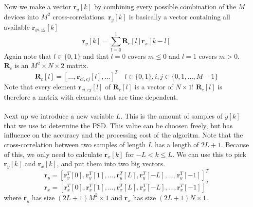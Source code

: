 \documentclass[report, oneside, a4paper, openany]{memoir}
\begin{document}
Now we make a vector $\mathbf{r}_y[k]$ by combining every possible combination of the $M$ devices into $M^2$ cross-correlations. $\mathbf{r}_y[k]$ is basically a vector containing all available $\mathbf{r}_{yi,yj}[k]$
$$
\mathbf{r}_y[k]=\sum_{l=0}^1\mathbf{R}_c[l]\mathbf{r}_x[k-l]
$$
Again note that $l \in \{0,1\}$ and that $l=0$ covers $m\leq 0$ and $l=1$ covers $m > 0$. $\mathbf{R}_c$ is an $M^2 \times N \times 2$ matrix.
$$
\mathbf{R}_c[l] = [\dots,\mathbf{r}_{ci,cj}[l],\dots]^T \quad l \in \{0,1\}, i,j \in \{0,1, \dots, M-1\}
$$
Note that every element $\mathbf{r}_{ci,cj}[l]$ of $\mathbf{R}_c[l]$ is a vector of $N \times 1$! $\mathbf{R}_c[l]$ is therefore a matrix with elements that are time dependent.\\
\\
Next up we introduce a new variable $L$. This is the amount of samples of $y[k]$ that we use to determine the PSD. This value can be choosen freely, 
but has influence on the accuracy and the processing cost of the algoritm. 
Note that the cross-correlation between two samples of length $L$ has a length of $2L+1$. 
Because of this, we only need to calculate $\mathbf{r}_x[k]$ for $-L<k\leq L$. 
We can use this to pick $\mathbf{r}_y[k]$ and $\mathbf{r}_x[k]$, and put them into two big vectors.
$$
\mathbf{r}_y = [\mathbf{r}^T_y[0],\mathbf{r}^T_y[1],\dots,\mathbf{r}^T_y[L],\mathbf{r}^T_y[-L],\dots,\mathbf{r}^T_y[-1]]^T
$$
$$
\mathbf{r}_x = [\mathbf{r}^T_x[0],\mathbf{r}^T_x[1],\dots,\mathbf{r}^T_x[L],\mathbf{r}^T_x[-L],\dots,\mathbf{r}^T_x[-1]]^T
$$
where $\mathbf{r}_y$ has size $(2L+1)M^2\times 1$ and $\mathbf{r}_x$ has size $(2L+1)N \times 1$. \\
\end{document}
